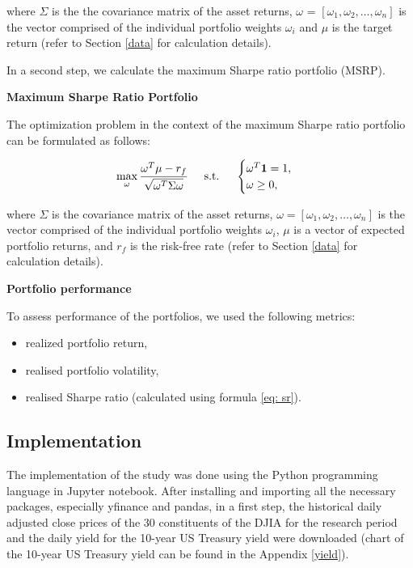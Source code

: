 \documentclass[a4paper,12pt]{article}
\begin{document}
where $\Sigma$ is the the covariance matrix of the asset returns, $\omega$ = $[\omega_1, \omega_2, \dots, \omega_n]$ is the vector comprised of the individual portfolio weights $\omega_i$ and $\mu$ is the target return (refer to Section \ref{data} for calculation details).

In a second step, we calculate the maximum Sharpe ratio portfolio (MSRP).

\textbf{Maximum Sharpe Ratio Portfolio}

The optimization problem in the context of the maximum Sharpe ratio portfolio can be formulated as follows:

\begin{equation} \label{eq: maxsr}
    \max_\omega \frac{\omega^T \mu - r_f}{\sqrt{\omega^T \Sigma \omega}} \hspace{0.5cm} \text{s.t.} \hspace{0.5cm} 
        \begin{cases} 
        \omega^T \mathbf{1} = 1, \\ 
        \omega \geq 0,
        \end{cases} 
\end{equation}

where $\Sigma$ is the covariance matrix of the asset returns, $\omega = [\omega_1, \omega_2, \dots, \omega_n]$ is the vector comprised of the individual portfolio weights $\omega_i$, $\mu$ is a vector of expected portfolio returns, and $r_f$ is the risk-free rate (refer to Section \ref{data} for calculation details).

\textbf{Portfolio performance}

To assess performance of the portfolios, we used the following metrics:

\begin{itemize}
    \item realized portfolio return,
    \item realised portfolio volatility,
    \item realised Sharpe ratio (calculated using formula \ref{eq: sr}).
\end{itemize}

\subsection{Implementation}

The implementation of the study was done using the Python programming language in Jupyter notebook. After installing and importing all the necessary packages, especially yfinance and pandas, in a first step, the historical daily adjusted close prices of the 30 constituents of the DJIA for the research period and the daily yield for the 10-year US Treasury yield were downloaded (chart of the 10-year US Treasury yield can be found in the Appendix \ref{yield}).
\end{document}
